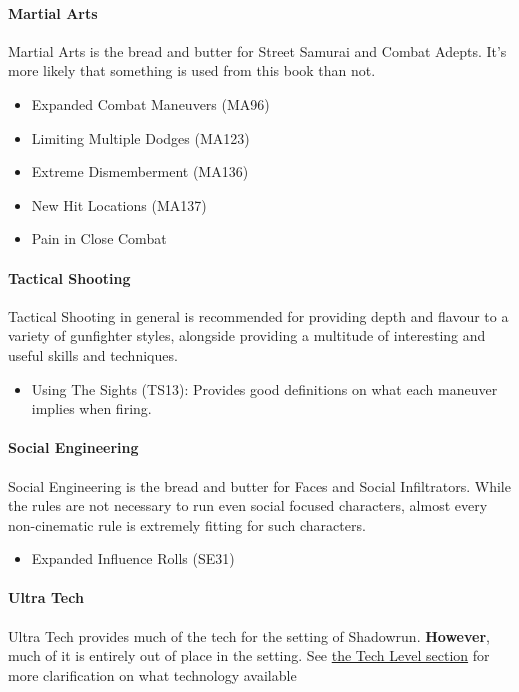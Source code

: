 \begin{multicols*}{3}
	\paragraph{\GURPS Martial Arts}
	Martial Arts is the bread and butter for Street Samurai and Combat Adepts. It's more likely that something is used from this book than not.
	
	\begin{itemize}
		\itemsep0em 
		\item Expanded Combat Maneuvers (MA96)
		\item Limiting Multiple Dodges (MA123)
		\item Extreme Dismemberment (MA136)
		\item New Hit Locations (MA137)
		\item Pain in Close Combat
	\end{itemize}
	
	\paragraph{\GURPS Tactical Shooting}
	\GURPS Tactical Shooting in general is recommended for providing depth and flavour to a variety of gunfighter styles, alongside providing a multitude of interesting and useful skills and techniques.
	\begin{itemize}
		\itemsep0em 
		\item Using The Sights (TS13): Provides good definitions on what each maneuver implies when firing.
	\end{itemize}
	
	\paragraph{\GURPS Social Engineering}
	\GURPS Social Engineering is the bread and butter for Faces and Social Infiltrators. While the rules are not necessary to run even social focused characters, almost every non-cinematic rule is extremely fitting for such characters.
	\begin{itemize}
		\itemsep0em 
		\item Expanded Influence Rolls (SE31)
	\end{itemize}
	
	\paragraph{\GURPS Ultra Tech}
	Ultra Tech provides much of the tech for the setting of Shadowrun. \textbf{However}, much of it is entirely out of place in the setting. See \hyperref[TL]{the Tech Level section} for more clarification on what technology available
	

\end{multicols*}
